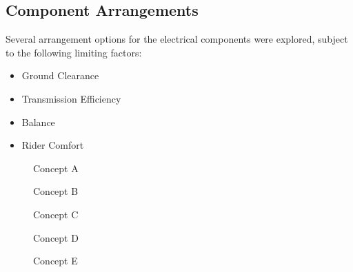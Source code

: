\documentclass[journal,10pt]{IEEEtran}
\begin{document}
    \subsection{Component Arrangements}
        Several arrangement options for the electrical components were explored, subject to the following limiting factors:
        \begin{itemize}
            	\item Ground Clearance
            	\item Transmission Efficiency
            	\item Balance 
            	\item Rider Comfort
            \end{itemize}
        \begin{figure}[H]
                \centering
                \caption{Concept A}
                \label{fig:ConceptA}
            \end{figure} 
        \begin{figure}[H]
                \centering
                \caption{Concept B}
                \label{fig:ConceptB}
            \end{figure}  
        \begin{figure}[H]
                \centering
                \caption{Concept C}
                \label{fig:ConceptC}
            \end{figure} 
        \begin{figure}[H]
                \centering
                \caption{Concept D}
                \label{Fig:ConceptD}
            \end{figure} 
        \begin{figure}[H]
                \centering
                \caption{Concept E}
                \label{Fig:ConceptE}
            \end{figure}
\end{document}
